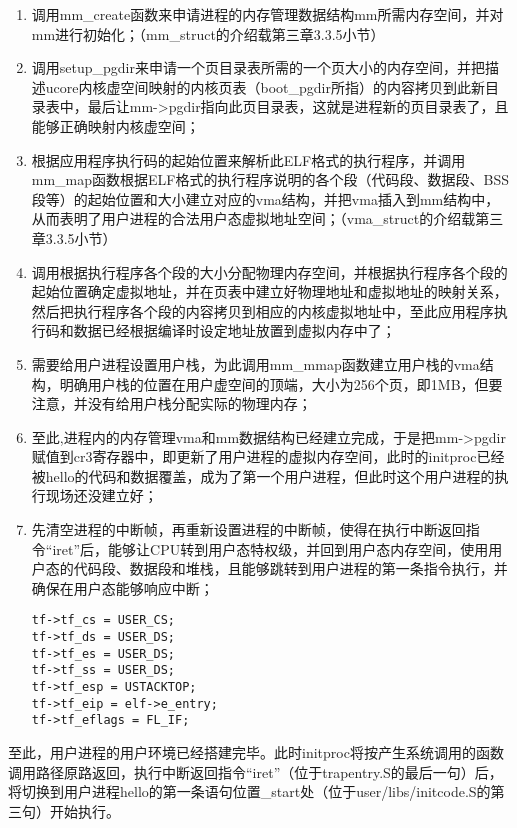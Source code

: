 \begin{enumerate}
\def\labelenumi{\arabic{enumi}.}
\item
  调用mm\_create函数来申请进程的内存管理数据结构mm所需内存空间，并对mm进行初始化；（mm\_struct的介绍载第三章3.3.5小节）
\item
  调用setup\_pgdir来申请一个页目录表所需的一个页大小的内存空间，并把描述ucore内核虚空间映射的内核页表（boot\_pgdir所指）的内容拷贝到此新目录表中，最后让mm-\textgreater{}pgdir指向此页目录表，这就是进程新的页目录表了，且能够正确映射内核虚空间；
\item
  根据应用程序执行码的起始位置来解析此ELF格式的执行程序，并调用mm\_map函数根据ELF格式的执行程序说明的各个段（代码段、数据段、BSS段等）的起始位置和大小建立对应的vma结构，并把vma插入到mm结构中，从而表明了用户进程的合法用户态虚拟地址空间；（vma\_struct的介绍载第三章3.3.5小节）
\item
  调用根据执行程序各个段的大小分配物理内存空间，并根据执行程序各个段的起始位置确定虚拟地址，并在页表中建立好物理地址和虚拟地址的映射关系，然后把执行程序各个段的内容拷贝到相应的内核虚拟地址中，至此应用程序执行码和数据已经根据编译时设定地址放置到虚拟内存中了；
\item
  需要给用户进程设置用户栈，为此调用mm\_mmap函数建立用户栈的vma结构，明确用户栈的位置在用户虚空间的顶端，大小为256个页，即1MB，但要注意，并没有给用户栈分配实际的物理内存；
\item
  至此,进程内的内存管理vma和mm数据结构已经建立完成，于是把mm-\textgreater{}pgdir赋值到cr3寄存器中，即更新了用户进程的虚拟内存空间，此时的initproc已经被hello的代码和数据覆盖，成为了第一个用户进程，但此时这个用户进程的执行现场还没建立好；
\item
  先清空进程的中断帧，再重新设置进程的中断帧，使得在执行中断返回指令``iret''后，能够让CPU转到用户态特权级，并回到用户态内存空间，使用用户态的代码段、数据段和堆栈，且能够跳转到用户进程的第一条指令执行，并确保在用户态能够响应中断；

\begin{lstlisting}
tf->tf_cs = USER_CS;
tf->tf_ds = USER_DS;
tf->tf_es = USER_DS;
tf->tf_ss = USER_DS;
tf->tf_esp = USTACKTOP;
tf->tf_eip = elf->e_entry;
tf->tf_eflags = FL_IF;
\end{lstlisting}
\end{enumerate}

至此，用户进程的用户环境已经搭建完毕。此时initproc将按产生系统调用的函数调用路径原路返回，执行中断返回指令``iret''（位于trapentry.S的最后一句）后，将切换到用户进程hello的第一条语句位置\_start处（位于user/libs/initcode.S的第三句）开始执行。
